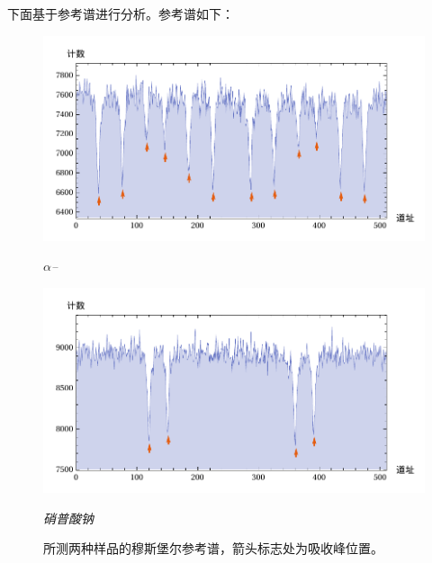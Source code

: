 \documentclass[aps,pre,12pt,preprint,%
	onecolumn,showpacs,showkeys,nofootinbib]{revtex4-1}
\newcommand{\FeAlpha}{$\alpha$--\tup{Fe}}
\newcommand{\NaSample}{硝普酸钠}
\begin{document}
\clearpage
	\noindent 下面基于参考谱进行分析。参考谱如下：
	\begin{figure}[!ht]
	\centering
	\includegraphics[width=1.\linewidth]{data/plots/feRef.pdf}
	\par
	\textit{ \FeAlpha}
	\par
	\includegraphics[width=1.\linewidth]{data/plots/naRef.pdf}
	\par
	\textit{ \NaSample}
	\caption{
		所测两种样品的穆斯堡尔参考谱，箭头标志处为吸收峰位置。
	}
	\end{figure}
\FloatBarrier
\clearpage
\setlength{\jot}{0pt}
	
\end{document}
